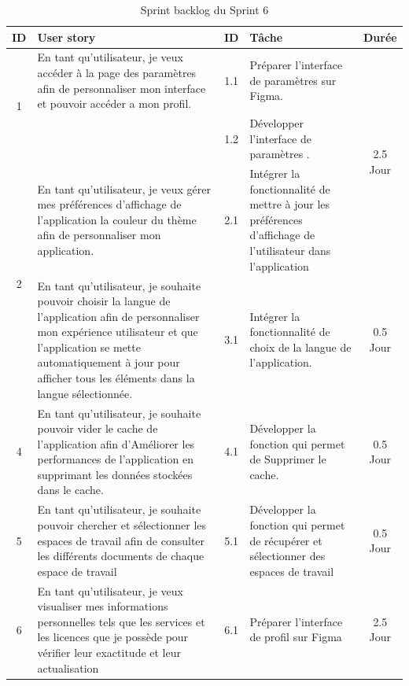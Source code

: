 \begin{adjustwidth}{-1cm}{}
    
    \begin{longtable}{|c|p{6cm}|c|p{6cm}|c|}
      \caption{Sprint backlog du Sprint 6} \label{tab:sprint-backlog-6} \\
      \hline
      \textbf{ID} & \textbf{User story} & \textbf{ID}  & \textbf{Tâche} & \textbf{Durée} \\
      \hline
      \multirow{2}{*}{1} & En tant qu'utilisateur, je veux accéder à la page des paramètres afin de personnaliser mon interface et pouvoir accéder a mon profil.
      & 1.1 & Préparer l'interface de paramètres sur Figma. & \multirow{3}{*}{2.5 Jour} \\
      \cline{3-4}
      & & 1.2 & Développer l'interface de paramètres	. & \\
      \cline{1-5}
      \multirow{2}{*}{2} & En tant qu'utilisateur, je veux gérer mes préférences d'aﬀichage de l'application la couleur du thème afin de personnaliser mon application.&2.1&Intégrer la fonctionnalité de mettre à jour les préférences d'affichage de l'utilisateur dans l'application &  \multirow{3}{*}{2.5 Jour} \\
      \cline{1-5}
      \multirow{1}{*}{3} & En tant qu'utilisateur, je souhaite pouvoir choisir la langue de l'application afin de personnaliser mon expérience utilisateur et que l'application se mette automatiquement à jour pour afficher tous les éléments dans la langue sélectionnée. & 3.1 &Intégrer la fonctionnalité de choix de la langue de l'application. & \multirow{1}{*}{0.5 Jour} \\
      \cline{1-5}
      \multirow{1}{*}{4} & En tant qu'utilisateur, je souhaite pouvoir vider le cache de l'application afin d'Améliorer les performances de l'application en supprimant les données stockées dans le cache. & 4.1 &Développer la fonction qui permet de Supprimer le cache. & \multirow{1}{*}{0.5 Jour} \\
      \cline{1-5}
      \multirow{1}{*}{5} & En tant qu'utilisateur, je souhaite pouvoir chercher et sélectionner les espaces de travail afin de consulter les différents documents de chaque espace de travail & 5.1 & Développer la fonction qui permet de récupérer et sélectionner des espaces de travail & \multirow{1}{*}{0.5 Jour} \\
      \cline{1-5}
      \multirow{3}{*}{6} & En tant qu'utilisateur, je veux visualiser mes informations personnelles tels que les services et les licences que je possède pour vérifier leur exactitude et leur actualisation & 6.1 & Préparer l'interface de profil sur Figma & \multirow{3}{*}{2.5 Jour} \\

\end{longtable}
\end{adjustwidth}
